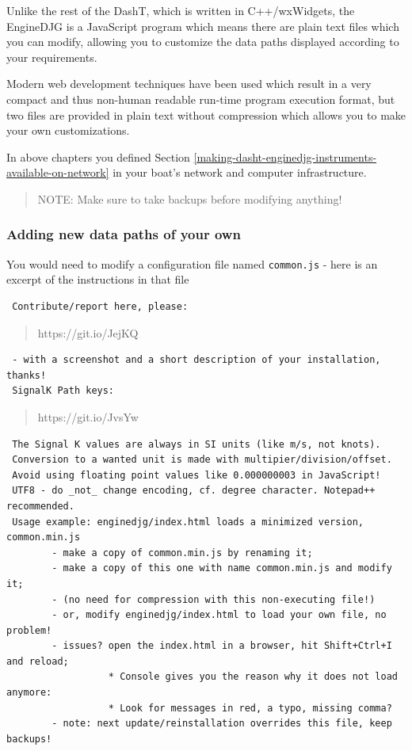 \documentclass[11pt]{article}
\begin{document}
    Unlike the rest of the DashT, which is written in C++/wxWidgets, the
EngineDJG is a JavaScript program which means there are plain text files
which you can modify, allowing you to customize the data paths displayed
according to your requirements.

    Modern web development techniques have been used which result in a very
compact and thus non-human readable run-time program execution format,
but two files are provided in plain text without compression which
allows you to make your own customizations.

    In above chapters you defined
Section \ref{making-dasht-enginedjg-instruments-available-on-network} in
your boat's network and computer infrastructure.

    \begin{quote}
NOTE: Make sure to take backups before modifying anything!
\end{quote}

    \hypertarget{adding-new-data-paths-of-your-own}{%
\subsubsection{Adding new data paths of your
own}\label{adding-new-data-paths-of-your-own}}

    You would need to modify a configuration file named \texttt{common.js} -
here is an excerpt of the instructions in that file

    \begin{verbatim}
 Contribute/report here, please:
\end{verbatim}

\begin{quote}
https://git.io/JejKQ
\end{quote}

\begin{verbatim}
 - with a screenshot and a short description of your installation, thanks!
 SignalK Path keys:
\end{verbatim}

\begin{quote}
https://git.io/JvsYw
\end{quote}

\begin{verbatim}
 The Signal K values are always in SI units (like m/s, not knots).
 Conversion to a wanted unit is made with multipier/division/offset.
 Avoid using floating point values like 0.000000003 in JavaScript!
 UTF8 - do _not_ change encoding, cf. degree character. Notepad++ recommended.
 Usage example: enginedjg/index.html loads a minimized version, common.min.js
        - make a copy of common.min.js by renaming it;
        - make a copy of this one with name common.min.js and modify it;
        - (no need for compression with this non-executing file!)
        - or, modify enginedjg/index.html to load your own file, no problem!
        - issues? open the index.html in a browser, hit Shift+Ctrl+I and reload;
                  * Console gives you the reason why it does not load anymore:
                  * Look for messages in red, a typo, missing comma?
        - note: next update/reinstallation overrides this file, keep backups!
\end{verbatim}
\end{document}
